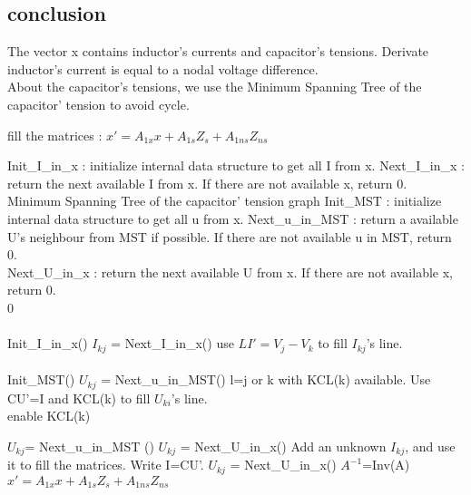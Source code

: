 \subsection{conclusion}
The vector x contains inductor's currents and capacitor's tensions. Derivate inductor's current is equal to a
nodal voltage difference.\\
About the capacitor's tensions, we use the Minimum Spanning Tree of the capacitor' tension to avoid cycle.\\


\begin{algorithm}
\caption{fill the matrices : $x'=A_{1x}x+A_{1s}Z_{s}+A_{1ns}Z_{ns}$ }
\begin{algorithmic}
\REQUIRE Init\_I\_in\_x : initialize internal data structure to get all I from x.
\REQUIRE Next\_I\_in\_x : return the next available I from x. If there are not available x, return 0.\\
\REQUIRE Minimum Spanning Tree of the capacitor' tension graph
\REQUIRE Init\_MST : initialize internal data structure to get all u from x.
\REQUIRE Next\_u\_in\_MST : return a available U's neighbour from MST if possible. If there are not
available u in MST, return 0.\\
\REQUIRE Next\_U\_in\_x : return the next available U from x. If there are not available x, return 0.\\

0\\
\\
\STATE Init\_I\_in\_x()
\STATE $I_{kj}$ = Next\_I\_in\_x()
\STATE use $LI'=V_{j}-V_{k}$ to fill $I_{kj}$'s line.
\ENDWHILE\\
\\
\STATE Init\_MST()
\STATE $U_{kj}$ = Next\_u\_in\_MST()
\STATE l=j or k with KCL(k) available.
\STATE Use CU'=I and KCL(k) to fill $U_{ki}$'s line.\\
\STATE enable KCL(k)

\STATE $U_{kj}$= Next\_u\_in\_MST ()
\ENDWHILE
\STATE $U_{kj}$ = Next\_U\_in\_x()
\STATE Add an unknown $I_{kj}$, and use it to fill the matrices. Write I=CU'.
\STATE $U_{kj}$ = Next\_U\_in\_x()
\ENDWHILE
{}
\STATE $A^{-1}$=Inv(A)
\STATE $x'=A_{1x}x+A_{1s}Z_{s}+A_{1ns}Z_{ns}$
\end{algorithmic}
\end{algorithm}

